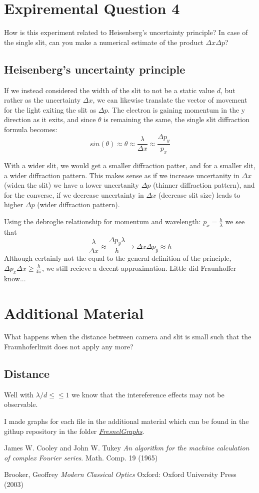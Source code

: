 \documentclass{article}
\begin{document}
\section{Expiremental Question 4}
How is this experiment related to Heisenberg’s uncertainty principle? In case of the single slit, can you make a numerical estimate of the product $\Delta x \Delta p$?

\subsection{Heisenberg’s uncertainty principle}
If we instead considered the width of the slit to not be a static value $d$, but rather as the uncertainty $\Delta x$, we can likewise translate the vector of movement for the light exiting the slit as $ \Delta p$. The electron is gaining momentum in the y direction as it exits, and since $\theta $ is remaining the same,  the single slit diffraction formula becomes: $$sin(\theta) \approx \theta \approx \frac{\lambda}{\Delta x} \approx \frac{\Delta p_y }{p_x}$$

With a wider slit, we would get a smaller diffraction patter, and for a smaller slit, a wider diffraction pattern. This makes sense as if we increase uncertanity in $\Delta x$ (widen the slit) we have a lower uncertanity $\Delta p$ (thinner diffraction pattern), and for the converse, if we decrease uncertainty in $\Delta x$ (decrease slit size) leads to higher $\Delta p$ (wider diffraction pattern).

Using the debroglie relationship for momentum and wavelength: $p_x = \frac{h}{\lambda}$ we see that $$\frac{\lambda}{\Delta x} \approx \frac{\Delta p_y  \lambda}{h} \rightarrow \Delta x \Delta p_y \approx h$$ Although certainly not the equal to the general definition of the principle, $\Delta p_x \Delta x \geq \frac{h}{4\pi} $, we still recieve a decent approximation. Little did Fraunhoffer know...

\section{Additional Material}
What happens when the distance between camera and slit is small such that the Fraunhoferlimit does not apply any more?
\subsection{ Distance }
Well with $\lambda / d \leq \leq 1$ we know that the intereference effects may not be observable.

I made graphs for each file in the additional material which can be found in the githup repository in the folder \href{https://github.com/fusionby2030/Numerical_Methods/tree/master/Labs/017E/FresnelGraphs}{\textit{FresnelGraphs}}.

\begin{thebibliography}{9}
James W. Cooley and John W. Tukey
\textit{An algorithm for the machine calculation of complex Fourier series}.
Math. Comp. 19 (1965)

Brooker, Geoffrey
\textit{Modern Classical Optics}
Oxford: Oxford University Press (2003)
\end{thebibliography}
\end{document}
